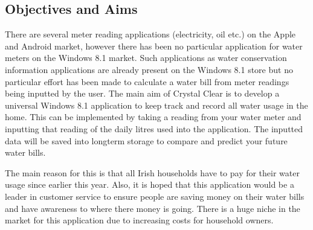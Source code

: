 \documentclass[runningheads,a4paper]{llncs}
\begin{document}
\subsection{Objectives and Aims}
\begin{inparaenum}[]
There are several meter reading applications (electricity, oil etc.) on the Apple and Android market, however there has been no particular application for water meters on the Windows 8.1 market. Such applications as water conservation information applications are already present on the Windows 8.1 store but no particular effort has been made to calculate a water bill from meter readings being inputted by the user. The main aim of Crystal Clear is to develop a universal Windows 8.1 application to keep track and record all water usage in the home. This can be implemented by taking a reading from your water meter and inputting that reading of the daily litres used  into the application. The inputted data will be saved into longterm storage to compare and predict your future water bills.
\end{inparaenum}

\begin{inparaenum}[]
The main reason for this is that all Irish households have to pay for their water usage since earlier this year. Also, it is hoped that this application would be a leader in customer service to ensure people are saving money on their water bills and have awareness to where there money is going. There is a huge niche in the market for this application due to increasing costs for household owners. 
\end{inparaenum}
\end{document}
